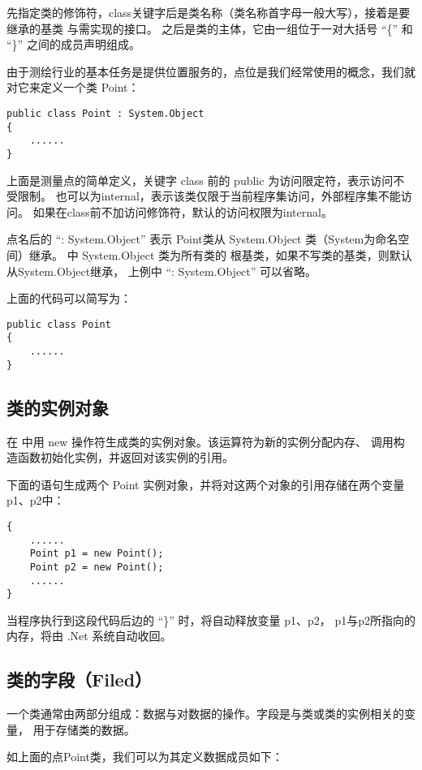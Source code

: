 先指定类的修饰符，class关键字后是类名称（类名称首字母一般大写），接着是要继承的基类
与需实现的接口。
之后是类的主体，它由一组位于一对大括号 ``\{'' 和 ``\}'' 之间的成员声明组成。

由于测绘行业的基本任务是提供位置服务的，点位是我们经常使用的概念，我们就对它来定义一个类 Point：

\begin{lstlisting}
public class Point : System.Object
{
    ......
}
\end{lstlisting}

上面是测量点的简单定义，关键字 class 前的 public 为访问限定符，表示访问不受限制。 
也可以为internal，表示该类仅限于当前程序集访问，外部程序集不能访问。
如果在class前不加访问修饰符，默认的访问权限为internal。

点名后的 ``: System.Object'' 表示 Point类从 System.Object 类（System为命名空间）继承。
\cs 中 System.Object 类为所有类的 根基类，如果不写类的基类，则默认从System.Object继承，
上例中 ``: System.Object'' 可以省略。

上面的代码可以简写为：
\begin{lstlisting}
public class Point
{
    ......
}
\end{lstlisting}

\subsection{类的实例对象}

在 \cs 中用 new 操作符生成类的实例对象。该运算符为新的实例分配内存、
调用构造函数初始化实例，并返回对该实例的引用。

下面的语句生成两个 Point 实例对象，并将对这两个对象的引用存储在两个变量p1、p2中：

\begin{lstlisting}
{
    ......
    Point p1 = new Point();
    Point p2 = new Point();
    ......
}
\end{lstlisting}

当程序执行到这段代码后边的 ``\}'' 时，将自动释放变量 p1、p2，
p1与p2所指向的内存，将由 .Net 系统自动收回。

\subsection{类的字段（Filed）}
一个类通常由两部分组成：数据与对数据的操作。字段是与类或类的实例相关的变量，
用于存储类的数据。

如上面的点Point类，我们可以为其定义数据成员如下：

